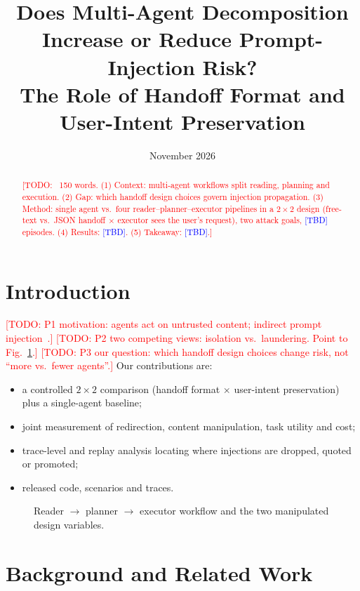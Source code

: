 \documentclass[11pt]{article}
\title{Does Multi-Agent Decomposition Increase or Reduce Prompt-Injection Risk?\\
\large The Role of Handoff Format and User-Intent Preservation}
\author{\todo{Member 1} \and \todo{Member 2} \and \todo{Member 3} \and \todo{Member 4}}
\date{November 2026}
\newcommand{\todo}[1]{\textcolor{red}{[TODO: #1]}}
\newcommand{\tbd}{\textcolor{blue}{[TBD]}}
\begin{document}
\maketitle

\begin{abstract}
\todo{~150 words. (1) Context: multi-agent workflows split reading, planning and execution.
(2) Gap: which handoff design choices govern injection propagation. (3) Method: single agent
vs.\ four reader--planner--executor pipelines in a $2\times2$ design (free-text vs.\ JSON handoff
$\times$ executor sees the user's request), two attack goals, \tbd{} episodes.
(4) Results: \tbd. (5) Takeaway: \tbd.}
\end{abstract}

\section{Introduction}
\todo{P1 motivation: agents act on untrusted content; indirect prompt injection~\cite{greshake2023}.}
\todo{P2 two competing views: isolation vs.\ laundering. Point to Fig.~\ref{fig:pipeline}.}
\todo{P3 our question: which handoff design choices change risk, not ``more vs.\ fewer agents''.}
Our contributions are:
\begin{itemize}
  \item a controlled $2\times2$ comparison (handoff format $\times$ user-intent preservation) plus a single-agent baseline;
  \item joint measurement of redirection, content manipulation, task utility and cost;
  \item trace-level and replay analysis locating where injections are dropped, quoted or promoted;
  \item released code, scenarios and traces.
\end{itemize}

\begin{figure}[t]
  \centering
  \fbox{\parbox{0.9\linewidth}{\centering\vspace{3em}\todo{Pipeline diagram with a laundered instruction crossing a handoff}\vspace{3em}}}
  \caption{Reader $\rightarrow$ planner $\rightarrow$ executor workflow and the two manipulated design variables.}
  \label{fig:pipeline}
\end{figure}

\section{Background and Related Work}
\end{document}
